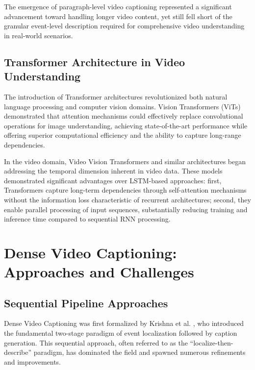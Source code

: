 The emergence of paragraph-level video captioning \cite{yu2016video,xiong2018move,lei2020mart} represented a significant advancement toward handling longer video content, yet still fell short of the granular event-level description required for comprehensive video understanding in real-world scenarios.

\subsection{Transformer Architecture in Video Understanding}
The introduction of Transformer architectures \cite{Vaswani2017-sc} revolutionized both natural language processing and computer vision domains.
Vision Transformers (ViTs) \cite{Dosovitskiy2021-vn} demonstrated that attention mechanisms could effectively replace convolutional operations for image understanding, achieving state-of-the-art performance while offering superior computational efficiency and the ability to capture long-range dependencies.

In the video domain, Video Vision Transformers \cite{Arnab2021-gv} and similar architectures began addressing the temporal dimension inherent in video data.
These models demonstrated significant advantages over LSTM-based approaches: first, Transformers capture long-term dependencies through self-attention mechanisms without the information loss characteristic of recurrent architectures; second, they enable parallel processing of input sequences, substantially reducing training and inference time compared to sequential RNN processing.

\section{Dense Video Captioning: Approaches and Challenges}
\label{sec:dense_video_captioning}

\subsection{Sequential Pipeline Approaches}
Dense Video Captioning was first formalized by Krishna et al. \cite{Krishna2017-pw}, who introduced the fundamental two-stage paradigm of event localization followed by caption generation.
This sequential approach, often referred to as the ``localize-then-describe'' paradigm, has dominated the field and spawned numerous refinements and improvements.

